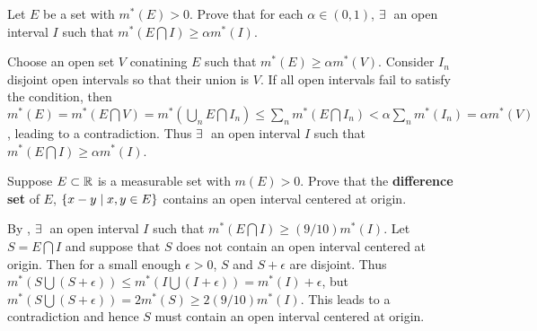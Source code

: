 \begin{exercise}
    Let $E$ be a set with $m^*(E)>0$. Prove that for each 
    $\alpha\in (0,1)$, $\exists\:$ an open interval $I$ such that 
    $m^*(E\bigcap I)\geq\alpha m^*(I)$.
\end{exercise}
\begin{pf}
    Choose an open set $V$ conatining $E$ such that $m^*(E)\geq 
    \alpha m^*(V)$. Consider $I_n$ disjoint open intervals so 
    that their union is $V$. If all open intervals fail to satisfy 
    the condition, then $m^*(E) = m^*(E\bigcap V) = 
    m^*(\bigcup_n E\bigcap I_n) \leq \sum_n m^*(E\bigcap I_n) 
    < \alpha\sum_n m^*(I_n) = \alpha m^*(V)$, leading to a 
    contradiction. Thus $\exists\:$ an open interval $I$ such that 
    $m^*(E\bigcap I)\geq\alpha m^*(I)$.
\end{pf}

\begin{exercise}
    Suppose $E\subset\mathbb{R}$ is a measurable set with $m(E)>0$. Prove 
    that the \textbf{difference set} of $E$, $\left\{ x-y \;\middle\vert\; x,y\in E \right\}$ 
    contains an open interval centered at origin.
\end{exercise}
\begin{pf}
    By , $\exists\:$ an open interval $I$ such that 
    $m^*(E\bigcap I)\geq (9/10)m^*(I)$. Let $S = E\bigcap I$ and 
    suppose that $S$ does not contain an open interval centered 
    at origin. Then for a small enough $\epsilon>0$, $S$ and 
    $S+\epsilon$ are disjoint. Thus $m^*(S\bigcup(S+\epsilon))\leq 
    m^*(I\bigcup(I+\epsilon)) = m^*(I)+\epsilon$, but 
    $m^*(S\bigcup(S+\epsilon)) = 2 m^*(S) \geq 2(9/10)m^*(I)$. 
    This leads to a contradiction and hence $S$ must contain an 
    open interval centered at origin.
\end{pf}

